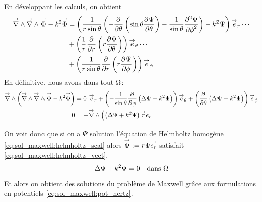%
En développant les calculs, on obtient
\begin{align*}
  \vrot \vrot \vect \Phi - k^2 \vect \Phi
  &= \left(\frac{1}{r\sin\theta}\left(-\ddr{\theta}{}\left(\sin\theta\ddr{\theta}{\Psi}\right)-\frac{1}{\sin\theta}\ddr[2]{\phi}{\Psi}\right)-k^2\Psi\right)\vect e_r \cdots \\
  &+ \left(\frac{1}{r}\ddr{r}{}\left(r\ddr{\theta}{\Psi}\right)\right)\vect e_\theta \cdots \\
  &+ \left(\frac{1}{r\sin\theta}\ddr{r}{}\left(r\ddr{\phi}{\Psi}\right)\right)\vect e_\phi
\end{align*}
En définitive, nous avons dans tout \(\OO\):
\begin{align*}
  \vrot\left(\vrot \vrot \vect \Phi - k^2 \vect \Phi\right)
  &= %
   0 ~ \vect e_r
  + \left(-\frac{1}{\sin\theta}\ddr{\phi}{}\left(\Delta \Psi + k^2 \Psi \right)\right)\vect e_\theta
  + \left(\ddr{\theta}{}\left(\Delta \Psi + k^2 \Psi \right)\right)\vect e_\phi \\
  0 &= -\vrot \left( \left(\Delta \Psi + k^2\Psi\right)\vect r e_r\right]
\end{align*}

On voit donc que si on a \(\Psi\) solution l'équation de Helmholtz homogène  \eqref{eq:sol_maxwell:helmholtz_scal} alors  \(\vect \Phi:=r\Psi\vect{e_r}\) satisfait \eqref{eq:sol_maxwell:helmholtz_vect}.
\begin{equation}
  \label{eq:sol_maxwell:helmholtz_scal}
   \Delta \Psi + k^2\Psi = 0 \quad \text{dans \(\OO\)}
\end{equation}

Et alors on obtient des solutions du problème de Maxwell grâce aux formulations en potentiels \eqref{eq:sol_maxwell:pot_hertz}.

